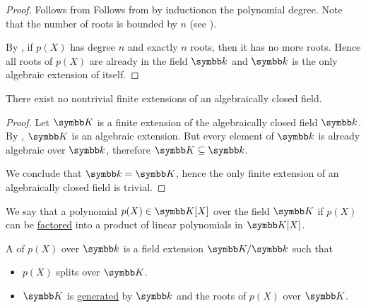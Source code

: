 \begin{proof}
   Follows from  Follows from  by induction\IND on the polynomial degree. Note that the number of roots is bounded by \( n \) (see ).

   By , if \( p(X) \) has degree \( n \) and exactly \( n \) roots, then it has no more roots. Hence all roots of \( p(X) \) are already in the field \( \Bk \) and \( \Bk \) is the only algebraic extension of itself.
\end{proof}

\begin{proposition}\label{thm:no_finite_extensions_of_closed_fields}
  There exist no nontrivial finite extensions of an algebraically closed field.
\end{proposition}
\begin{proof}
  Let \( \BK \) is a finite extension of the algebraically closed field \( \Bk \). By , \( \BK \) is an algebraic extension. But every element of \( \Bk \) is already algebraic over \( \Bk \), therefore \( \BK \subseteq \Bk \).

  We conclude that \( \Bk = \BK \), hence the only finite extension of an algebraically closed field is trivial.
\end{proof}

\begin{definition}\label{def:splitting_field}
  We say that a polynomial \( p(X) \in \BK[X] \) over the field \( \BK \)  if \( p(X) \) can be \hyperref[def:factorization_in_ring]{factored} into a product of linear polynomials in \( \BK[X] \).

  A  of \( p(X) \) over \( \Bk \) is a field extension \( \BK / \Bk \) such that
  \begin{itemize}
    \item \( p(X) \) splits over \( \BK \).
    \item \( \BK \) is \hyperref[def:generated_ring_ideal]{generated} by \( \Bk \) and the roots of \( p(X) \) over \( \BK \).
  \end{itemize}
\end{definition}

